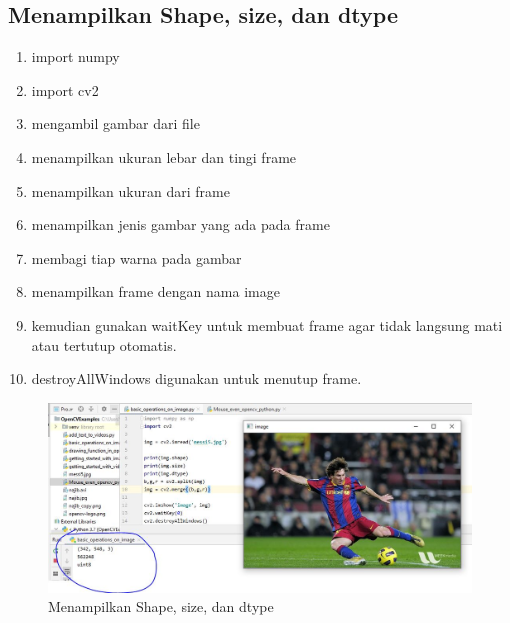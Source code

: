 \newpage
\subsection{Menampilkan Shape, size, dan dtype}

\begin{enumerate}
	\item import numpy
	\item import cv2
	\item mengambil gambar dari file 
	\item menampilkan ukuran lebar dan tingi frame
	\item menampilkan ukuran dari frame
	\item menampilkan jenis gambar yang ada pada frame
	\item membagi tiap warna pada gambar
	\item menampilkan frame dengan nama image 
	\item kemudian gunakan waitKey untuk membuat frame agar tidak langsung mati atau tertutup otomatis.
	\item destroyAllWindows digunakan untuk menutup frame.
\end{enumerate}

\newpage
\begin{figure}[ht]
\centering
\includegraphics[scale=0.5]{figures/2,26.jpg}
\caption{Menampilkan Shape, size, dan dtype}
\label{contoh}
\end{figure}



\newpage
